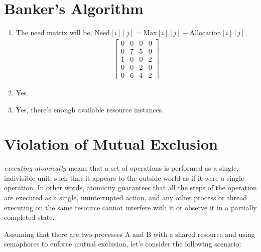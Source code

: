 \documentclass{article}
\begin{document}
\section{Banker's Algorithm}

\begin{enumerate}[label=(\alph*)]
	\item The need matrix will be, $\text{Need}[i][j]= \text{Max}[i][j] - \text{Allocation}[i][j]$,
	      \begin{align}
		      \begin{bmatrix}
			      0 & 0 & 0 & 0 \\
			      0 & 7 & 5 & 0 \\
			      1 & 0 & 0 & 2 \\
			      0 & 0 & 2 & 0 \\
			      0 & 6 & 4 & 2
		      \end{bmatrix}
	      \end{align}

	\item Yes.

	\item Yes, there's enough available resource instances.
\end{enumerate}



\section{Violation of Mutual Exclusion}%
\textit{executing atomically} means that a set of operations is performed as a single, indivisible unit, such that it appears to the outside world as if it were a single operation. In other words, atomicity guarantees that all the steps of the operation are executed as a single, uninterrupted action, and any other process or thread executing on the same resource cannot interfere with it or observe it in a partially completed state.


Assuming that there are two processes A and B with a shared resource and using semaphores to enforce mutual exclusion, let's consider the following scenario:
\end{document}
